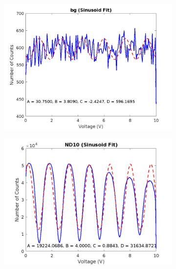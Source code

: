 \documentclass{article}
\numberwithin{equation}{section}
\begin{document}
\begin{figure}[h]
    \centering
    \begin{subfigure}[b]{0.45\textwidth}
        \includegraphics[width=\textwidth]{bg_sinusoid_fit.png}
    \end{subfigure}
    \hfill
    \begin{subfigure}[b]{0.45\textwidth}
        \includegraphics[width=\textwidth]{ND10_sinusoid_fit.png}
    \end{subfigure}
    \
    \begin{subfigure}[b]{0.45\textwidth}

\end{subfigure}
\end{figure}
\end{document}
